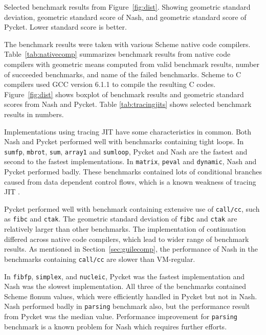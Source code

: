 \documentclass[preprint, 10pt]{sigplanconf}
\begin{document}
\begin{table}
  \centering
  
  \caption{Selected benchmark results from
    Figure~\hyperref[fig:dist]{\ref{fig:dist}}. Showing geometric standard
    deviation, geometric standard score of Nash, and geometric standard score of
    Pycket. Lower standard score is better.}
\label{tab:tracingjits}
\end{table}

The benchmark results were taken with various Scheme native code compilers.
Table~\hyperref[tab:impls]{\ref{tab:nativecomp}} summarizes benchmark results
from native code compilers with geometric means computed from valid benchmark
results, number of succeeded benchmarks, and name of the failed
benchmarks. Scheme to C compilers used GCC version 6.1.1 to compile the
resulting C codes. Figure~\hyperref[fig:dist]{\ref{fig:dist}} shows boxplot of
benchmark results and geometric standard scores from Nash and Pycket. Table
\hyperref[tab:tracingjits]{\ref{tab:tracingjits}} shows selected benchmark
results in numbers.

Implementations using tracing JIT have some characteristics in common. Both Nash
and Pycket performed well with benchmarks containing tight loops. In
\texttt{sumfp}, \texttt{mbrot}, \texttt{sum}, \texttt{array1} and
\texttt{sumloop}, Pycket and Nash are the fastest and second to the fastest
implementations.  In \texttt{matrix}, \texttt{peval} and \texttt{dynamic}, Nash
and Pycket performed badly. These benchmarks contained lots of conditional
branches caused from data dependent control flows, which is a known weakness of
tracing JIT \citep{bauman2015pycket}.

Pycket performed well with benchmark containing extensive use of
\texttt{call/cc}, such as \texttt{fibc} and \texttt{ctak}. The geometric
standard deviation of \texttt{fibc} and \texttt{ctak} are relatively larger than
other benchmarks. The implementation of continuation differed across native code
compilers, which lead to wider range of benchmark results. As mentioned in
Section~\ref{sec:guilecomp}, the performance of Nash in the benchmarks
containing \texttt{call/cc} are slower than VM-regular.

In \texttt{fibfp}, \texttt{simplex}, and \texttt{nucleic}, Pycket was the
fastest implementation and Nash was the slowest implementation. All three of the
benchmarks contained Scheme flonum values, which were efficiently handled in
Pycket but not in Nash.  Nash performed badly in \texttt{parsing} benchmark
also, but the performance result from Pycket was the median value. Performance
improvement for \texttt{parsing} benchmark is a known problem for Nash which
requires further efforts.
\end{document}
